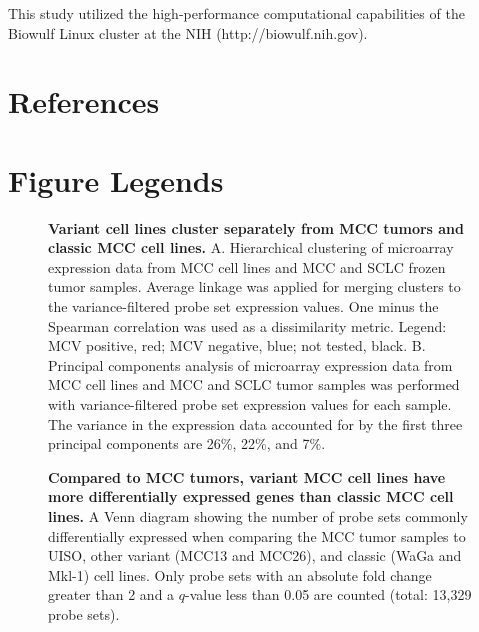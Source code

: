\documentclass[10pt]{article}
\begin{document}
This study utilized the high-performance computational capabilities of the Biowulf Linux cluster at the NIH (http://biowulf.nih.gov).

\section*{References}
\begin{singlespace}

\end{singlespace}

\newpage

\section*{Figure Legends}

\begin{figure}[!ht]
  \begin{center}
  \end{center}
  
  \caption{
    {\bf Variant cell lines cluster separately from MCC tumors and classic MCC cell lines.}
    A. Hierarchical clustering of microarray expression data from MCC cell lines and MCC and SCLC frozen tumor samples.
    Average linkage was applied for merging clusters to the variance-filtered probe set expression values.
    One minus the Spearman correlation was used as a dissimilarity metric.
    Legend: MCV positive, red; MCV negative, blue; not tested, black.
    B. Principal components analysis of microarray expression data from MCC cell lines and MCC and SCLC tumor samples was performed with variance-filtered probe set expression values for each sample.
    The variance in the expression data accounted for by the first three principal components are 26\%, 22\%, and 7\%.}
  
  \label{fig:clustering}

\end{figure}

\begin{figure}[!ht]

  \begin{center}
  \end{center}

  \caption{
    {\bf Compared to MCC tumors, variant MCC cell lines have more differentially expressed genes than classic MCC cell lines.}
    A Venn diagram showing the number of probe sets commonly differentially expressed when comparing the MCC tumor samples to UISO, other variant (MCC13 and MCC26), and classic (WaGa and Mkl-1) cell lines.
    Only probe sets with an absolute fold change greater than 2 and a $q$-value less than 0.05 are counted (total: 13,329 probe sets).}

  \label{fig:venn}
\end{figure}
\end{document}
